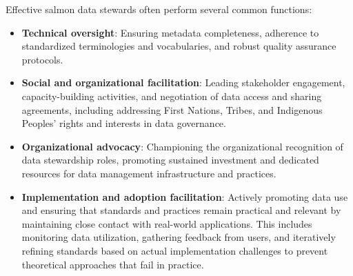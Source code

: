 \documentclass[
  letterpaper,
  DIV=11,
  numbers=noendperiod]{scrartcl}
\begin{document}
\begin{tcolorbox}[enhanced jigsaw, opacitybacktitle=0.6, left=2mm, coltitle=black, opacityback=0, colbacktitle=quarto-callout-note-color!10!white, titlerule=0mm, colback=white, leftrule=.75mm, toprule=.15mm, bottomtitle=1mm, toptitle=1mm, title=\textcolor{quarto-callout-note-color}{\faInfo}\hspace{0.5em}{Box 1: Common Functions of Salmon Data Stewards}, rightrule=.15mm, breakable, colframe=quarto-callout-note-color-frame, arc=.35mm, bottomrule=.15mm]

Effective salmon data stewards often perform several common functions:

\begin{itemize}
\item
  \textbf{Technical oversight}: Ensuring metadata completeness,
  adherence to standardized terminologies and vocabularies, and robust
  quality assurance protocols.
\item
  \textbf{Social and organizational facilitation}: Leading stakeholder
  engagement, capacity-building activities, and negotiation of data
  access and sharing agreements, including addressing First Nations,
  Tribes, and Indigenous Peoples' rights and interests in data
  governance.
\item
  \textbf{Organizational advocacy}: Championing the organizational
  recognition of data stewardship roles, promoting sustained investment
  and dedicated resources for data management infrastructure and
  practices.
\item
  \textbf{Implementation and adoption facilitation}: Actively promoting
  data use and ensuring that standards and practices remain practical
  and relevant by maintaining close contact with real-world
  applications. This includes monitoring data utilization, gathering
  feedback from users, and iteratively refining standards based on
  actual implementation challenges to prevent theoretical approaches
  that fail in practice.
\end{itemize}

\end{tcolorbox}
\end{document}
